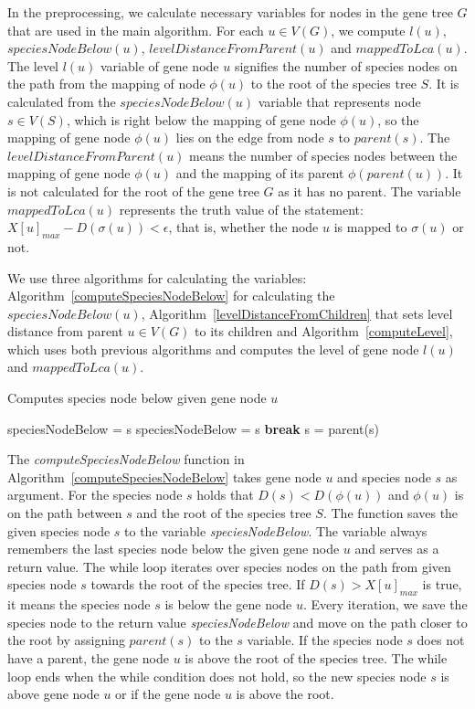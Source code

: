 In the preprocessing, we calculate necessary variables for nodes in the gene tree $G$ that are used in the main algorithm. For each $u \in V(G)$, we compute $l(u)$, $speciesNodeBelow(u)$, $levelDistanceFromParent(u)$ and $mappedToLca(u)$. The level $l(u)$ variable of gene node $u$ signifies the number of species nodes on the path from the mapping of node $\phi(u)$ to the root of the species tree $S$. It is calculated from the $speciesNodeBelow(u)$ variable that represents node $s \in V(S)$, which is right below the mapping of gene node $\phi(u)$, so the mapping of gene node $\phi(u)$ lies on the edge from node $s$ to $parent(s)$. The $levelDistanceFromParent(u)$ means the number of species nodes between the mapping of gene node $\phi(u)$ and the mapping of its parent $\phi(parent(u))$. It is not calculated for the root of the gene tree $G$ as it has no parent. The variable $mappedToLca(u)$ represents the truth value of the statement: $X[u]_{max} - D(\sigma(u)) < \epsilon$, that is, whether the node $u$ is mapped to $\sigma(u)$ or not. 

We use three algorithms for calculating the variables: Algorithm~\ref{computeSpeciesNodeBelow} for calculating the $speciesNodeBelow(u)$, Algorithm~\ref{levelDistanceFromChildren} that sets level distance from parent $u \in V(G)$ to its children and Algorithm~\ref{computeLevel}, which uses both previous algorithms and computes the level of gene node $l(u)$ and $mappedToLca(u)$.

\begin{algorithm}[!htbp]
\caption{Computes species node below given gene node $u$} 
\label{computeSpeciesNodeBelow}
\begin{algorithmic}[1]
	\State speciesNodeBelow = s
		\State speciesNodeBelow = s
			\State \textbf{break}
		\Else
			\State s = parent(s)
		\EndIf
	\EndWhile
\EndFunction
\end{algorithmic}
\end{algorithm}

The \emph{computeSpeciesNodeBelow} function in Algorithm~\ref{computeSpeciesNodeBelow} takes gene node $u$ and species node $s$ as argument. For the species node $s$ holds that $D(s) < D(\phi(u))$ and $\phi(u)$ is on the path between $s$ and the root of the species tree $S$. The function saves the given species node $s$ to the variable \emph{speciesNodeBelow}. The variable always remembers the last species node below the given gene node $u$ and serves as a return value. The while loop iterates over species nodes on the path from given species node $s$ towards the root of the species tree. If $D(s) > X[u]_{max}$ is true, it means the species node $s$ is below the gene node $u$. Every iteration, we save the species node to the return value \emph{speciesNodeBelow} and move on the path closer to the root by assigning $parent(s)$ to the $s$ variable. If the species node $s$ does not have a parent, the gene node $u$ is above the root of the species tree. The while loop ends when the while condition does not hold, so the new species node $s$ is above gene node $u$ or if the gene node $u$ is above the root.

